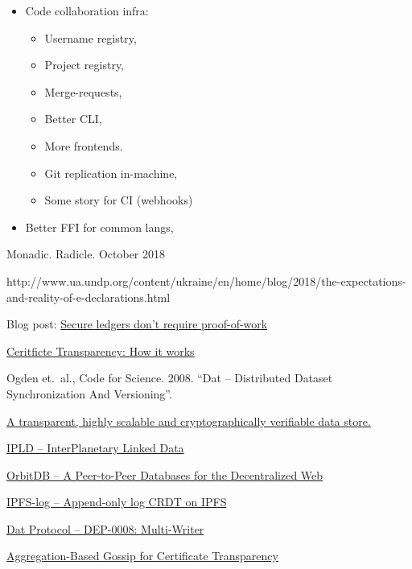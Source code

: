 \documentclass[a4paper, oneside, 10pt]{amsart}
\begin{document}
\begin{itemize}
\item
  Code collaboration infra:
  \begin{itemize}
  \item
    Username registry,
  \item
    Project registry,
  \item
    Merge-requests,
  \item
    Better CLI,
  \item
    More frontends.
  \item
    Git replication in-machine,
  \item
    Some story for CI (webhooks)
  \end{itemize}
\item
  Better FFI for common langs,
\end{itemize}

\begin{thebibliography}{9}

 Monadic. Radicle. October 2018

  http://www.ua.undp.org/content/ukraine/en/home/blog/2018/the-expectations-and-reality-of-e-declarations.html

 Blog post:
  \href{https://pfrazee.github.io/blog/secure-ledgers-dont-require-proof-of-work}{Secure
    ledgers don't require proof-of-work}

  \href{https://www.certificate-transparency.org/how-ct-works}{Ceritficte Transparency: How it works}

  Ogden et.~al., Code for Science. 2008. ``Dat -- Distributed Dataset Synchronization And Versioning''.

  \href{https://github.com/google/trillian}{A transparent, highly scalable and cryptographically verifiable data store.}

  \href{https://github.com/ipld/ipld}{IPLD -- InterPlanetary Linked Data}

  \href{https://github.com/orbitdb/orbit-db}{OrbitDB -- A Peer-to-Peer Databases for the Decentralized Web}

  \href{https://github.com/orbitdb/ipfs-log}{IPFS-log -- Append-only log CRDT on IPFS}

  \href{https://www.datprotocol.com/deps/0008-multiwriter/}{Dat Protocol -- DEP-0008: Multi-Writer}

  \href{https://arxiv.org/pdf/1806.08817.pdf}{Aggregation-Based Gossip for Certificate Transparency}
  
\end{thebibliography}
\end{document}
